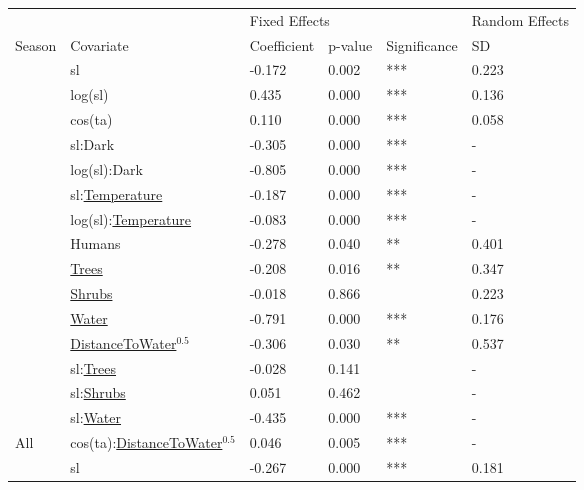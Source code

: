 
\begin{tabular}[t]{llllll}
\toprule
\multicolumn{1}{l}{} & \multicolumn{1}{l}{} & \multicolumn{3}{l}{Fixed Effects} & \multicolumn{1}{l}{Random Effects} \\
\cmidrule(l{3pt}r{3pt}){3-5} \cmidrule(l{3pt}r{3pt}){6-6}
Season & Covariate & Coefficient & p-value & Significance & SD\\
\midrule
 & sl & -0.172 & 0.002 & *** & 0.223\\

 & log(sl) & 0.435 & 0.000 & *** & 0.136\\

 & cos(ta) & 0.110 & 0.000 & *** & 0.058\\

 & sl:Dark & -0.305 & 0.000 & *** & -\\

 & log(sl):Dark & -0.805 & 0.000 & *** & -\\

 & sl:\underline{Temperature} & -0.187 & 0.000 & *** & -\\

 & log(sl):\underline{Temperature} & -0.083 & 0.000 & *** & -\\

 & Humans & -0.278 & 0.040 & ** & 0.401\\

 & \underline{Trees} & -0.208 & 0.016 & ** & 0.347\\

 & \underline{Shrubs} & -0.018 & 0.866 &  & 0.223\\

 & \underline{Water} & -0.791 & 0.000 & *** & 0.176\\

 & \underline{DistanceToWater}$^{0.5}$ & -0.306 & 0.030 & ** & 0.537\\

 & sl:\underline{Trees} & -0.028 & 0.141 &  & -\\

 & sl:\underline{Shrubs} & 0.051 & 0.462 &  & -\\

 & sl:\underline{Water} & -0.435 & 0.000 & *** & -\\

\multirow{-16}{*}{\raggedright\arraybackslash All} & cos(ta):\underline{DistanceToWater}$^{0.5}$ & 0.046 & 0.005 & *** & -\\
\cmidrule{1-6}
 & sl & -0.267 & 0.000 & *** & 0.181\\


\end{tabular}
